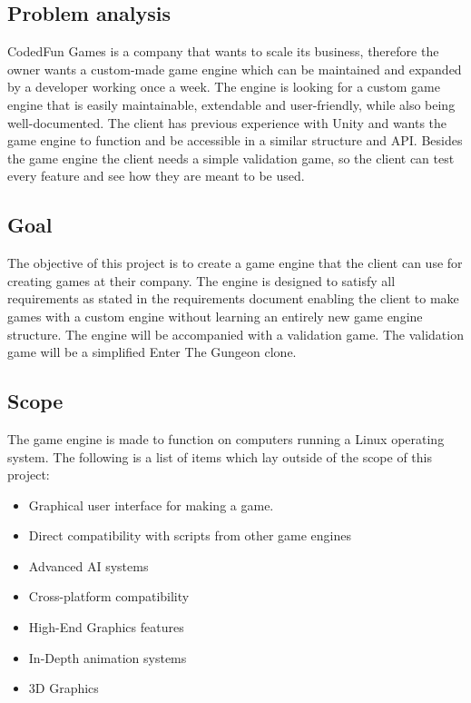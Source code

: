 \documentclass{article} %
\begin{document}
\subsection{Problem analysis}
CodedFun Games is a company that wants to scale its business, therefore
the owner wants a custom-made game engine which can be maintained and expanded by a developer working once a week.
The engine is looking for a custom game engine that is easily maintainable, extendable and user-friendly, while also being well-documented.
The client has previous experience with Unity and wants the game engine to function and be accessible in a similar structure and API.
\newline \newline
Besides the game engine the client needs a simple validation game, so the client can test every feature and see how they are meant to be used.

\subsection{Goal}
The objective of this project is to create a game engine that the client can use for creating games at their company.
The engine is designed to satisfy all requirements as stated in the requirements document enabling the client to make games with a custom engine without learning an entirely new game engine structure.
The engine will be accompanied with a validation game. 
The validation game will be a simplified Enter The Gungeon clone.


\subsection{Scope}
The game engine is made to function on computers running a Linux operating system.
\newline\newline
The following is a list of items which lay outside of the scope of this project:
\begin{itemize}
    \item Graphical user interface for making a game.
    \item Direct compatibility with scripts from other game engines
    \item Advanced AI systems
    \item Cross-platform compatibility
    \item High-End Graphics features
    \item In-Depth animation systems
    \item 3D Graphics
\end{itemize}
\end{document}
